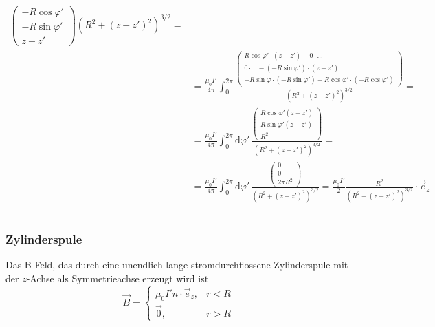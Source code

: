 \documentclass{article}
\newcommand{\diff}{\mathrm{d}}
\newcommand{\lr}[1]{\left(#1\right)}
\begin{document}
{\begin{align*}
{\begin{pmatrix}
				-R\cos\varphi'\\
				-R\sin\varphi'\\
				z-z'
			\end{pmatrix}
			}
			{
			\lr{R^2 + (z-z')^2}^{3/2}
			}
			=\\
			&= \frac{\mu_0 I'}{4\pi} \int_0^{2\pi}
			\frac{
			\begin{pmatrix}
				R\cos\varphi' \cdot (z-z') - 0 \cdot ...\\
				0 \cdot ... - (-R\sin\varphi') \cdot (z-z')\\
				-R\sin\varphi \cdot (-R\sin\varphi') - R\cos\varphi' \cdot (-R\cos\varphi')
			\end{pmatrix}
			}
			{
			\lr{R^2 + (z-z')^2}^{3/2}
			} =\\
			&= \frac{\mu_0 I'}{4\pi} \int_0^{2\pi} \diff\varphi'\,
			\frac{
			\begin{pmatrix}
				R\cos\varphi' (z-z') \\
				R\sin\varphi' (z-z') \\
				R^2
			\end{pmatrix}
			}
			{
			\lr{R^2 + (z-z')^2}^{3/2}
			} =\\
			&= \frac{\mu_0 I'}{4\pi} \int_0^{2\pi} \diff\varphi'\,
			\frac{
			\begin{pmatrix}
				0\\0\\2\pi R^2
			\end{pmatrix}
			}
			{
			\lr{R^2 + (z-z')^2}^{3/2}
			}
			=
			\frac{\mu_0 I'}{2} \frac{R^2}{\lr{R^2 + (z-z')^2}^{3/2}} \cdot \vec{e}_z
		\end{align*}
\hrule
}








\newpage



\subsubsection{Zylinderspule}
Das B-Feld, das durch eine unendlich lange stromdurchflossene Zylinderspule mit der $z$-Achse als Symmetrieachse erzeugt wird ist
	\begin{equation}
		\vec{B} = 
		\begin{cases}
			\mu_0 I' n \cdot \vec{e}_z,& r < R \\
			\vec{0}, & r > R
		\end{cases}
	\end{equation}
\end{document}

